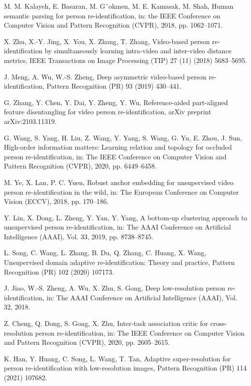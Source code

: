 \documentclass[review]{elsarticle}
\begin{document}
\begin{thebibliography}{1}
M. M. Kalayeh, E. Basaran, M. G¨okmen, M. E. Kamasak, M. Shah, Human semantic parsing for person re-identification, in: the IEEE Conference on Computer Vision and Pattern Recognition (CVPR), 2018, pp. 1062–1071.

X. Zhu, X.-Y. Jing, X. You, X. Zhang, T. Zhang, Video-based person re-identification by simultaneously learning intra-video and inter-video distance metrics, IEEE Transactions on Image Processing (TIP) 27 (11) (2018) 5683–5695.

J. Meng, A. Wu, W.-S. Zheng, Deep asymmetric video-based person re-identification, Pattern Recognition (PR) 93 (2019) 430–441.

G. Zhang, Y. Chen, Y. Dai, Y. Zheng, Y. Wu, Reference-aided part-aligned feature disentangling for video person re-identification, arXiv preprint arXiv:2103.11319.

G. Wang, S. Yang, H. Liu, Z. Wang, Y. Yang, S. Wang, G. Yu, E. Zhou, J. Sun, High-order information matters: Learning relation and topology for occluded person re-identification, in: The IEEE Conference on Computer Vision and Pattern Recognition (CVPR), 2020, pp. 6449–6458.

M. Ye, X. Lan, P. C. Yuen, Robust anchor embedding for unsupervised video person re-identification in the wild, in: The European Conference on Computer Vision (ECCV), 2018, pp. 170–186.

Y. Lin, X. Dong, L. Zheng, Y. Yan, Y. Yang, A bottom-up clustering approach to unsupervised person re-identification, in: The AAAI Conference on Artificial Intelligence (AAAI), Vol. 33, 2019, pp. 8738–8745.

L. Song, C. Wang, L. Zhang, B. Du, Q. Zhang, C. Huang, X. Wang, Unsupervised domain adaptive re-identification: Theory and practice, Pattern Recognition (PR) 102 (2020) 107173.

J. Jiao, W.-S. Zheng, A. Wu, X. Zhu, S. Gong, Deep low-resolution person re-identification, in: The AAAI Conference on Artificial Intelligence (AAAI), Vol. 32, 2018.

Z. Cheng, Q. Dong, S. Gong, X. Zhu, Inter-task association critic for cross-resolution person re-identification, in: The IEEE Conference on Computer Vision and Pattern Recognition (CVPR), 2020, pp. 2605–2615.

K. Han, Y. Huang, C. Song, L. Wang, T. Tan, Adaptive super-resolution for person re-identification with low-resolution images, Pattern Recognition (PR) 114 (2021) 107682.


\end{thebibliography}
\end{document}
